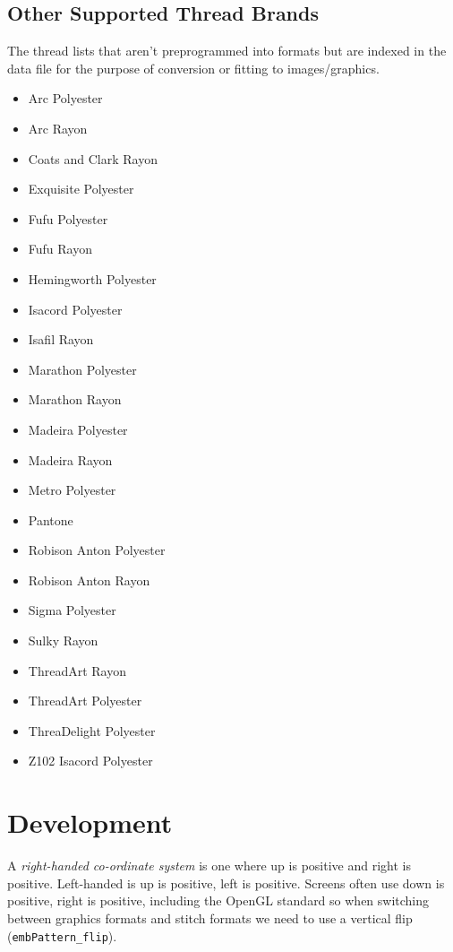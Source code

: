 \documentclass[onesize, a4paper]{refart}
\begin{document}
\subsection{Other Supported Thread Brands}

The thread lists that aren't preprogrammed into formats but
are indexed in the data file for the purpose of conversion
or fitting to images/graphics.

\begin{itemize}
\item Arc Polyester
\item Arc Rayon
\item Coats and Clark Rayon
\item Exquisite Polyester
\item Fufu Polyester
\item Fufu Rayon
\item Hemingworth Polyester
\item Isacord Polyester
\item Isafil Rayon
\item Marathon Polyester
\item Marathon Rayon
\item Madeira Polyester
\item Madeira Rayon
\item Metro Polyester
\item Pantone
\item Robison Anton Polyester
\item Robison Anton Rayon
\item Sigma Polyester
\item Sulky Rayon
\item ThreadArt Rayon
\item ThreadArt Polyester
\item ThreaDelight Polyester
\item Z102 Isacord Polyester
\end{itemize}

\section{Development}

A \emph{right-handed co-ordinate system} is one where up is positive and right is positive. Left-handed is up is positive, left is positive. Screens often use down is positive, right is positive, including the OpenGL standard so when switching between graphics formats and stitch formats we need to use a vertical flip (\texttt{embPattern\_flip}).
\end{document}
